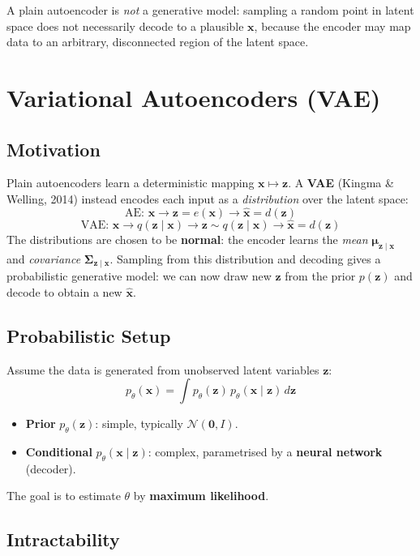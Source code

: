 \documentclass[11pt,a4paper]{article}
\theoremstyle{definition}
\theoremstyle{plain}
\theoremstyle{remark}
\begin{document}
A plain autoencoder is \emph{not} a generative model: sampling a random point in latent space does not necessarily decode to a plausible $\mathbf{x}$, because the encoder may map data to an arbitrary, disconnected region of the latent space.


\section{Variational Autoencoders (VAE)}

\subsection{Motivation}

Plain autoencoders learn a deterministic mapping $\mathbf{x} \mapsto \mathbf{z}$. A \textbf{VAE} (Kingma \& Welling, 2014) instead encodes each input as a \emph{distribution} over the latent space:
\[
    \text{AE: } \mathbf{x} \to \mathbf{z} = e(\mathbf{x}) \to \hat{\mathbf{x}} = d(\mathbf{z})
\]
\[
    \text{VAE: } \mathbf{x} \to q(\mathbf{z}\mid\mathbf{x}) \to \mathbf{z} \sim q(\mathbf{z}\mid\mathbf{x}) \to \hat{\mathbf{x}} = d(\mathbf{z})
\]
The distributions are chosen to be \textbf{normal}: the encoder learns the \emph{mean} $\boldsymbol{\mu}_{\mathbf{z}\mid\mathbf{x}}$ and \emph{covariance} $\boldsymbol{\Sigma}_{\mathbf{z}\mid\mathbf{x}}$. Sampling from this distribution and decoding gives a probabilistic generative model: we can now draw new $\mathbf{z}$ from the prior $p(\mathbf{z})$ and decode to obtain a new $\hat{\mathbf{x}}$.

\subsection{Probabilistic Setup}

Assume the data is generated from unobserved latent variables $\mathbf{z}$:
\[
    p_\theta(\mathbf{x}) = \int p_\theta(\mathbf{z})\, p_\theta(\mathbf{x}\mid\mathbf{z})\, d\mathbf{z}
\]
\begin{itemize}
    \item \textbf{Prior} $p_\theta(\mathbf{z})$: simple, typically $\mathcal{N}(\mathbf{0}, I)$.
    \item \textbf{Conditional} $p_\theta(\mathbf{x}\mid\mathbf{z})$: complex, parametrised by a \textbf{neural network} (decoder).
\end{itemize}
The goal is to estimate $\theta$ by \textbf{maximum likelihood}.

\subsection{Intractability}
\end{document}
